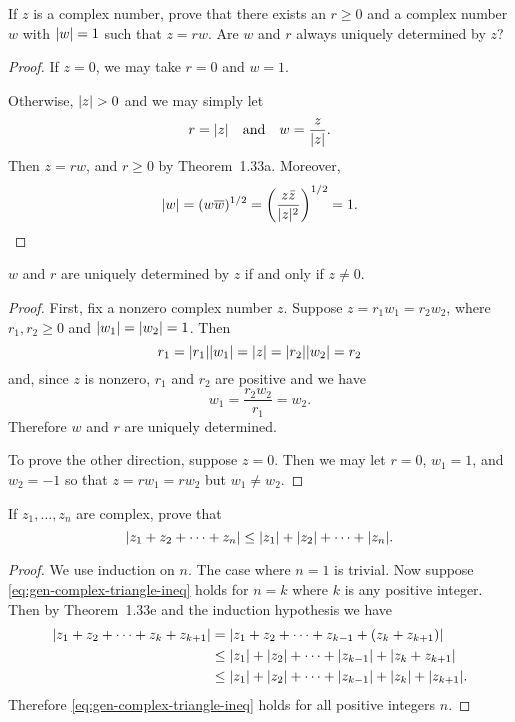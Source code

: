  If $z$ is a complex number, prove that there exists an
$r\geq0$ and a complex number $w$ with $\lvert{w}\rvert = 1$ such that
$z = rw$. Are $w$ and $r$ always uniquely determined by $z$?
\begin{proof}
  If $z = 0$, we may take $r = 0$ and $w = 1$.

  Otherwise, $\lvert{z}\rvert > 0$ and we may simply let
  \begin{equation*}
    r = \lvert{z}\rvert \quad\text{and}\quad w = \frac{z}{\lvert{z}\rvert}.
  \end{equation*}
  Then $z = rw$, and $r\geq0$ by Theorem~1.33a. Moreover,
  \begin{equation*}
    \lvert{w}\rvert = (w\overline{w})^{1/2}
    = \left(\frac{z\bar{z}}{\lvert{z}\rvert^2}\right)^{1/2}
    = 1. \qedhere
  \end{equation*}
\end{proof}
\begin{claim}
  $w$ and $r$ are uniquely determined by $z$ if and only if $z\neq0$.
\end{claim}
\begin{proof}
  First, fix a nonzero complex number $z$. Suppose
  $z = r_1w_1 = r_2w_2$, where $r_1,r_2\geq0$ and
  $\lvert{w_1}\rvert = \lvert{w_2}\rvert = 1$. Then
  \begin{equation*}
    r_1 = \lvert{r_1}\rvert\lvert{w_1}\rvert = \lvert{z}\rvert = \lvert{r_2}\rvert\lvert{w_2}\rvert = r_2
  \end{equation*}
  and, since $z$ is nonzero, $r_1$ and $r_2$ are positive and we have
  \begin{equation*}
    w_1 = \frac{r_2w_2}{r_1} = w_2.
  \end{equation*}
  Therefore $w$ and $r$ are uniquely determined.

  To prove the other direction, suppose $z = 0$. Then we may let
  $r = 0$, $w_1 = 1$, and $w_2 = -1$ so that $z = rw_1 = rw_2$ but
  $w_1\neq w_2$.
\end{proof}

 If $z_1,\ldots,z_n$ are complex, prove that
\begin{equation}
  \label{eq:gen-complex-triangle-ineq}
  \lvert{z_1 + z_2 + \cdots + z_n}\rvert
  \leq \lvert{z_1}\rvert + \lvert{z_2}\rvert + \cdots + \lvert{z_n}\rvert.
\end{equation}
\begin{proof}
  We use induction on $n$. The case where $n = 1$ is trivial. Now
  suppose \eqref{eq:gen-complex-triangle-ineq} holds for $n = k$ where
  $k$ is any positive integer. Then by Theorem~1.33e and the induction
  hypothesis we have
  \begin{align*}
    \lvert{z_1 + z_2 + \cdots + z_k + z_{k+1}}\rvert
    &= \lvert{z_1 + z_2 + \cdots + z_{k-1} + (z_k + z_{k+1})}\rvert \\
    &\leq \lvert{z_1}\rvert + \lvert{z_2}\rvert + \cdots + \lvert{z_{k-1}}\rvert
      + \lvert{z_k + z_{k+1}}\rvert \\
    &\leq \lvert{z_1}\rvert + \lvert{z_2}\rvert + \cdots + \lvert{z_{k-1}}\rvert
      + \lvert{z_k}\rvert + \lvert{z_{k+1}}\rvert.
  \end{align*}
  Therefore \eqref{eq:gen-complex-triangle-ineq} holds for all
  positive integers $n$.
\end{proof}

